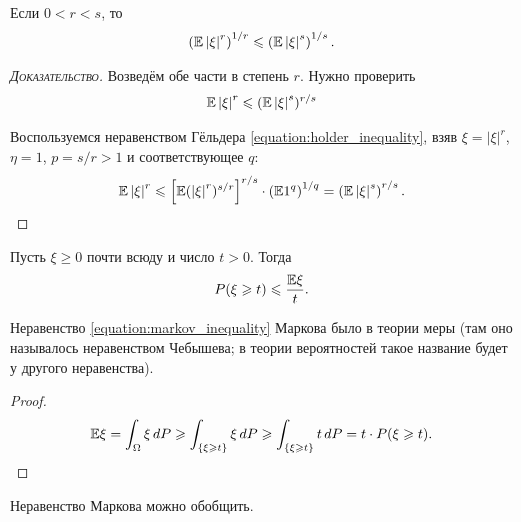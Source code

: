 \documentclass[../main.tex]{subfiles}
\begin{document}
\begin{prop}
 \label{proposition:Lyapunov_inequality}
 Если $ 0 < r < s $, то 
 \begin{align}
  \label{eq:lyapunov_inequality}
  \left(\mathbb E \left| \xi \right|^{r} \right)^{1/r} \leqslant \left( \mathbb E \left| \xi \right|^{s} \right)^{1/s}.
 \end{align} 
\end{prop}
\begin{proof}[\normalfont\textsc{Доказательство}]
 Возведём обе части в степень $r$. Нужно проверить 
 \begin{align*}
  \mathbb E \left|\xi\right|^r \leqslant (\mathbb E \left|\xi\right|^s)^{r/s}
 \end{align*}

 Воспользуемся неравенством Гёльдера \eqref{equation:holder_inequality}, взяв $ \xi = \left| \xi \right|^{r} $, $ \eta = 1 $, $ p = s / r > 1 $ и соответствующее $ q $:
 \begin{align*}
  \mathbb E \left| \xi \right|^{r} \leqslant \left[ \mathbb E (\left| \xi \right|^{r})^{s / r} \right]^{r / s} \cdot \left( \mathbb E 1^{q} \right)^{1 / q} = \left( \mathbb E \left| \xi \right|^{s} \right)^{r / s}.
 \end{align*}
\end{proof}

\begin{prop}
 Пусть $ \xi \geqslant 0 $ почти всюду и число $ t > 0 $. Тогда
 \begin{align}
  \label{equation:markov_inequality}
  P(\xi \geqslant t) \leqslant \frac{\mathbb E \xi}{t}.
 \end{align}  
\end{prop}

Неравенство \eqref{equation:markov_inequality} Маркова было в теории меры (там оно называлось неравенством Чебышева; в теории вероятностей такое название будет у другого неравенства).

\begin{proof}
 \begin{align*}
  \mathbb E \xi = \int_{\Omega} \xi\,dP \geqslant \int_{\left\{ \xi \geqslant t \right\}} \xi \,dP \geqslant \int_{\left\{ \xi \geqslant t \right\}}  t\,dP = t \cdot P(\xi \geqslant t).
 \end{align*}
\end{proof}

Неравенство Маркова можно обобщить.
\end{document}
